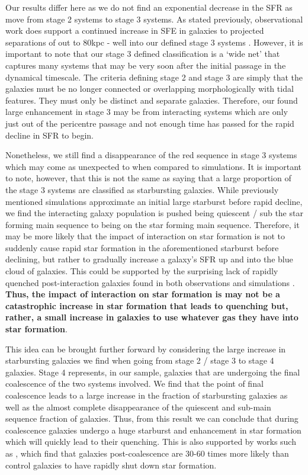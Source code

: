 Our results differ here as we do not find an exponential decrease in the SFR as move from stage 2 systems to stage 3 systems. As stated previously, observational work does support a continued increase in SFE in galaxies to projected separations of out to 80kpc - well into our defined stage 3 systems \citep[for further examples, see][]{2008MNRAS.385.1903L, 2012MNRAS.426..549S}. However, it is important to note that our stage 3 defined classification is a `wide net' that captures many systems that may be very soon after the initial passage in the dynamical timescale. The criteria defining stage 2 and stage 3 are simply that the galaxies must be no longer connected or overlapping morphologically with tidal features. They must only be distinct and separate galaxies. Therefore, our found large enhancement in stage 3 may be from interacting systems which are only just out of the pericentre passage and not enough time has passed for the rapid decline in SFR to begin. 

Nonetheless, we still find a disappearance of the red sequence in stage 3 systems which may come as unexpected to when compared to simulations. It is important to note, however, that this is not the same as saying that a large proportion of the stage 3 systems are classified as starbursting galaxies. While previously mentioned simulations approximate an initial large starburst before rapid decline, we find the interacting galaxy population is pushed being quiescent / sub the star forming main sequence to being on the star forming main sequence. Therefore, it may be more likely that the impact of interaction on star formation is not to suddenly cause rapid star formation in the aforementioned starburst before declining, but rather to gradually increase a galaxy's SFR up and into the blue cloud of galaxies. This could be supported by the surprising lack of rapidly quenched post-interaction galaxies found in both observations \citep{2017ApJ...845..145W} and simulations \citep{2020MNRAS.493.3716H, 2021MNRAS.504.1888Q}. \textbf{Thus, the impact of interaction on star formation is may not be a catastrophic increase in star formation that leads to quenching but, rather, a small increase in galaxies to use whatever gas they have into star formation}. %

This idea can be brought further forward by considering the large increase in starbursting galaxies we find when going from stage 2 / stage 3 to stage 4 galaxies. Stage 4 represents, in our sample, galaxies that are undergoing the final coalescence of the two systems involved. We find that the point of final coalescence leads to a large increase in the fraction of starbursting galaxies as well as the almost complete disappearance of the quiescent and sub-main sequence fraction of galaxies. Thus, from this result we can conclude that during coalescence galaxies undergo a huge starburst and enhancement in star formation which will quickly lead to their quenching. This is also supported by works such as \citet{2022MNRAS.517L..92E}, which find that galaxies post-coalescence are 30-60 times more likely than control galaxies to have rapidly shut down star formation.

